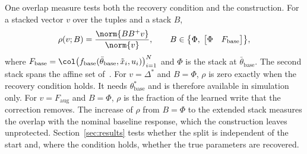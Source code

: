 One overlap measure tests both the recovery condition and the construction.
For a stacked vector $v$ over the tuples and a stack $B$,
\begin{equation}
 \rho(v;B)=\frac{\norm{BB^{+}v}}{\norm{v}},\qquad
 B\in\bigl\{\Phi,\;\begin{bmatrix}\Phi & F_{\mathrm{base}}\end{bmatrix}\bigr\},
\label{eq:obc_overlap}
\end{equation}
where $F_{\mathrm{base}}=\col\bigl(f_{\mathrm{base}}(\bar\theta_{\mathrm{base}},
\tilde x_i,u_i)\bigr)_{i=1}^{N}$ and $\Phi$ is the stack at
$\bar\theta_{\mathrm{base}}$.
The second stack spans the affine set of~\cite[Eq.~(18)]{gyorok2025l4dc}.
For $v=\Delta^*$ and $B=\Phi$, $\rho$ is zero exactly when the recovery
condition holds.
It needs $\theta^*_{\mathrm{base}}$ and is therefore available in simulation
only.
For $v=F_{\mathrm{aug}}$ and $B=\Phi$, $\rho$ is the fraction of the learned
write that the correction removes.
The increase of $\rho$ from $B=\Phi$ to the extended stack measures the
overlap with the nominal baseline response, which the construction leaves
unprotected.
Section~\ref{sec:results} tests whether the split is independent of the
start and, where the condition holds, whether the true parameters are
recovered.

